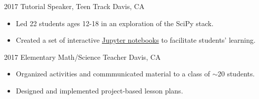 \documentclass[]{cv-style}          %
\begin{document}
\begin{entrylist}

\entry
  {2017}
  {Tutorial Speaker, Teen Track}
  {Davis, CA}
  { 
  \begin{itemize}
    \item Led 22 students ages 12-18 in an exploration of the SciPy stack.
    \item Created a set of interactive \href{https://github.com/eqfinney/SciPy}{Jupyter notebooks} to facilitate students' learning.\\
  \end{itemize}}
\entry
  {2017}
  {Elementary Math/Science Teacher}
  {Davis, CA}
  { 
  \begin{itemize}
    \item Organized activities and commmunicated material to a class of $\sim$20 students.
    \item Designed and implemented project-based lesson plans.\\
  \end{itemize}}


\end{entrylist}
  
\end{document}
